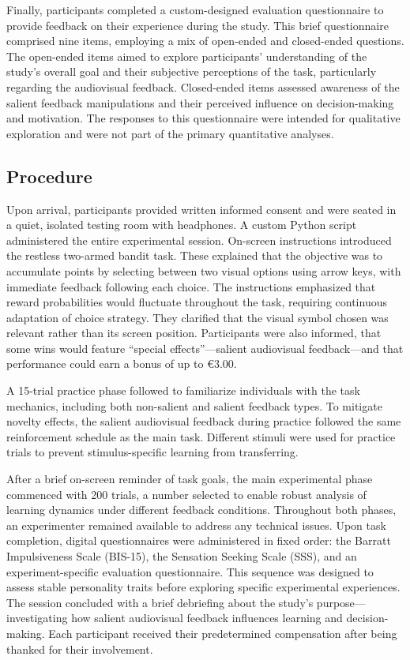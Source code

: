 Finally, participants completed a custom-designed evaluation questionnaire to provide feedback on their experience during the study. This brief questionnaire comprised nine items, employing a mix of open-ended and closed-ended questions. The open-ended items aimed to explore participants' understanding of the study's overall goal and their subjective perceptions of the task, particularly regarding the audiovisual feedback. Closed-ended items assessed awareness of the salient feedback manipulations and their perceived influence on decision-making and motivation. The responses to this questionnaire were intended for qualitative exploration and were not part of the primary quantitative analyses.

\subsection{Procedure}

Upon arrival, participants provided written informed consent and were seated in a quiet, isolated testing room with headphones. A custom Python script administered the entire experimental session. On-screen instructions introduced the restless two-armed bandit task. These explained that the objective was to accumulate points by selecting between two visual options using arrow keys, with immediate feedback following each choice. The instructions emphasized that reward probabilities would fluctuate throughout the task, requiring continuous adaptation of choice strategy. They clarified that the visual symbol chosen was relevant rather than its screen position. Participants were also informed, that some wins would feature ``special effects''—salient audiovisual feedback—and that performance could earn a bonus of up to €3.00.

A 15-trial practice phase followed to familiarize individuals with the task mechanics, including both non-salient and salient feedback types. To mitigate novelty effects, the salient audiovisual feedback during practice followed the same reinforcement schedule as the main task. Different stimuli were used for practice trials to prevent stimulus-specific learning from transferring.

After a brief on-screen reminder of task goals, the main experimental phase commenced with 200 trials, a number selected to enable robust analysis of learning dynamics under different feedback conditions. Throughout both phases, an experimenter remained available to address any technical issues. Upon task completion, digital questionnaires were administered in fixed order: the Barratt Impulsiveness Scale (BIS-15), the Sensation Seeking Scale (SSS), and an experiment-specific evaluation questionnaire. This sequence was designed to assess stable personality traits before exploring specific experimental experiences. The session concluded with a brief debriefing about the study's purpose—investigating how salient audiovisual feedback influences learning and decision-making. Each participant received their predetermined compensation after being thanked for their involvement.

